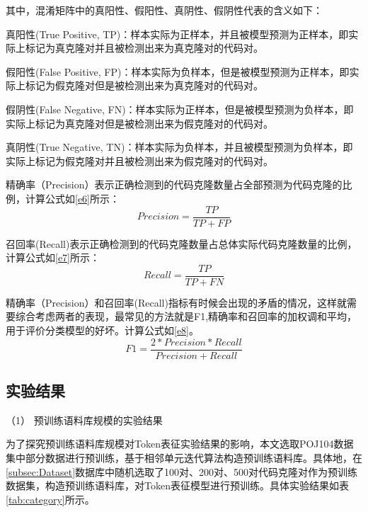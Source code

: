 其中，混淆矩阵中的真阳性、假阳性、真阴性、假阴性代表的含义如下：

真阳性(True Positive, TP)：样本实际为正样本，并且被模型预测为正样本，即实际上标记为真克隆对并且被检测出来为真克隆对的代码对。
 
假阳性(False Positive, FP)：样本实际为负样本，但是被模型预测为正样本，即实际上标记为假克隆对但是被检测出来为真克隆对的代码对。
 
假阴性(False Negative, FN)：样本实际为正样本，但是被模型预测为负样本，即实际上标记为真克隆对但是被检测出来为假克隆对的代码对。
 
真阴性(True Negative, TN)：样本实际为负样本，并且被模型预测为负样本，即实际上标记为假克隆对并且被检测出来为假克隆对的代码对。

精确率（Precision）表示正确检测到的代码克隆数量占全部预测为代码克隆的比例，计算公式如\ref{e6}所示：
\begin{equation}\label{e6}
  Precision = \frac{TP}{TP+FP} 
\end{equation}

召回率(Recall)表示正确检测到的代码克隆数量占总体实际代码克隆数量的比例，计算公式如\ref{e7}所示：
\begin{equation}\label{e7}
  Recall = \frac{TP}{TP+FN} 
\end{equation}

精确率（Precision）和召回率(Recall)指标有时候会出现的矛盾的情况，这样就需要综合考虑两者的表现，最常见的方法就是F1,精确率和召回率的加权调和平均，用于评价分类模型的好坏。计算公式如\ref{e8}。
\begin{equation}\label{e8}
  F1 = \frac{2*Precision*Recall}{Precision+Recall} 
\end{equation}

\subsection{实验结果}

（1） 预训练语料库规模的实验结果

为了探究预训练语料库规模对Token表征实验结果的影响，本文选取POJ104数据集中部分数据进行预训练，基于相邻单元迭代算法构造预训练语料库。具体地，在\ref{subsec:Dataset}数据库中随机选取了100对、200对、500对代码克隆对作为预训练数据集，构造预训练语料库，对Token表征模型进行预训练。具体实验结果如表\ref{tab:category}所示。

